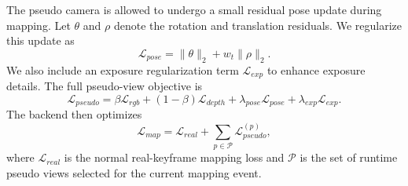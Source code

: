 The pseudo camera is allowed to undergo a small residual pose update during mapping. Let $\theta$ and $\rho$ denote the rotation and translation residuals. We regularize this update as
\begin{equation}
\mathcal{L}_{pose}
=
\|\theta\|_2 + w_t\|\rho\|_2 .
\end{equation}
We also include an exposure regularization term $\mathcal{L}_{exp}$ to enhance exposure details. The full pseudo-view objective is
\begin{equation}
\mathcal{L}_{pseudo}
=
\beta \mathcal{L}_{rgb}
+
(1-\beta)\mathcal{L}_{depth}
+
\lambda_{pose}\mathcal{L}_{pose}
+
\lambda_{exp}\mathcal{L}_{exp}.
\end{equation}
The backend then optimizes
\begin{equation}
\mathcal{L}_{map}
=
\mathcal{L}_{real}
+
\sum_{p\in\mathcal{P}}\mathcal{L}_{pseudo}^{(p)},
\end{equation}
where $\mathcal{L}_{real}$ is the normal real-keyframe mapping loss and $\mathcal{P}$ is the set of runtime pseudo views selected for the current mapping event.
